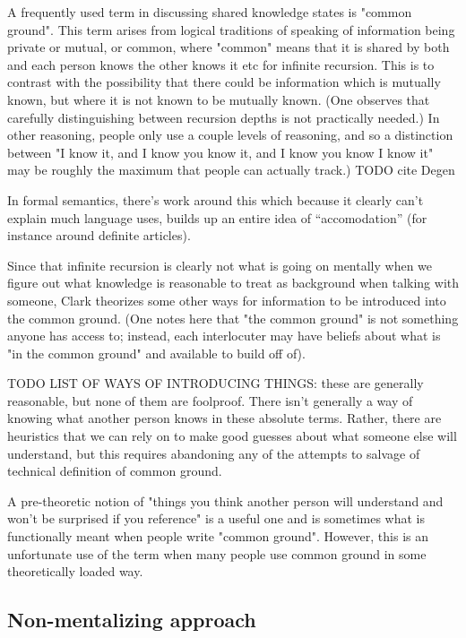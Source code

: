 \documentclass[]{article}
\begin{document}
A frequently used term in discussing shared knowledge states is "common ground". This term arises from logical traditions of speaking of information being private or mutual, or common, where "common" means that it is shared by both and each person knows the other knows it etc for infinite recursion. This is to contrast with the possibility that there could be information which is mutually known, but where it is not known to be mutually known. (One observes that carefully distinguishing between recursion depths is not practically needed.) In other reasoning, people only use a couple levels of reasoning, and so a distinction between "I know it, and I know you know it, and I know you know I know it" may be roughly the maximum that people can actually track.) TODO cite Degen

In formal semantics, there's work around this which because it clearly can't explain much language uses, builds up an entire idea of ``accomodation'' (for instance around definite articles). 

Since that infinite recursion is clearly not what is going on mentally when we figure out what knowledge is reasonable to treat as background when talking with someone, Clark theorizes some other ways for information to be introduced into the common ground. (One notes here that "the common ground" is not something anyone has access to; instead, each interlocuter may have beliefs about what is "in the common ground" and available to build off of). 

TODO LIST OF WAYS OF INTRODUCING THINGS: these are generally reasonable, but none of them are foolproof. There isn't generally a way of knowing what another person knows in these absolute terms. Rather, there are heuristics that we can rely on to make good guesses about what someone else will understand, but this requires abandoning any of the attempts to salvage of technical definition of common ground. 

A pre-theoretic notion of "things you think another person will understand and won't be surprised if you reference" is a useful one and is sometimes what is functionally meant when people write "common ground". However, this is an unfortunate use of the term when many people use common ground in some theoretically loaded way. 

\subsection{Non-mentalizing approach}
\end{document}
